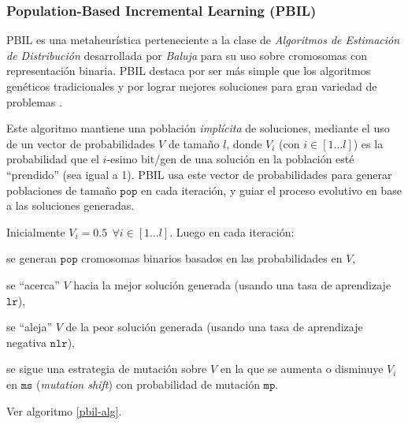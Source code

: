 \subsubsection{Population-Based Incremental Learning (PBIL)}

PBIL es una metaheurística perteneciente a la clase de \emph{Algoritmos de Estimación de Distribución} desarrollada por \emph{Baluja} \cite{Baluja94pbil} para su uso sobre cromosomas con representación binaria. PBIL destaca por ser más simple que los algoritmos genéticos tradicionales y por lograr mejores soluciones para gran variedad de problemas \cite{Baluja95anempirical,Baluja95removingthe}.

Este algoritmo mantiene una población \emph{implícita} de soluciones, mediante el uso de un vector de probabilidades $V$ de tamaño $l$, donde $V_i$ (con $i \in [1 \dots l]$) es la probabilidad que el $i$-esimo bit/gen de una solución en la población esté ``prendido'' (sea igual a 1). PBIL usa este vector de probabilidades para generar poblaciones de tamaño $\texttt{pop}$ en cada iteración, y guiar el proceso evolutivo en base a las soluciones generadas.

Inicialmente $V_i = 0.5\ \ \forall{i \in [1\dots l]}$. Luego en cada iteración:
\begin{inparaenum}
\item se generan $\texttt{pop}$ cromosomas binarios basados en las probabilidades en $V$,
\item se ``acerca'' $V$ hacia la mejor solución generada (usando una tasa de aprendizaje $\texttt{lr}$), 
\item se ``aleja'' $V$ de la peor solución generada (usando una tasa de aprendizaje negativa $\texttt{nlr}$),
\item se sigue una estrategia de mutación sobre $V$ en la que se aumenta o disminuye $V_i$ en $\texttt{ms}$ (\emph{mutation shift}) con probabilidad de mutación $\texttt{mp}$.
\end{inparaenum}
Ver algoritmo \ref{pbil-alg}.

